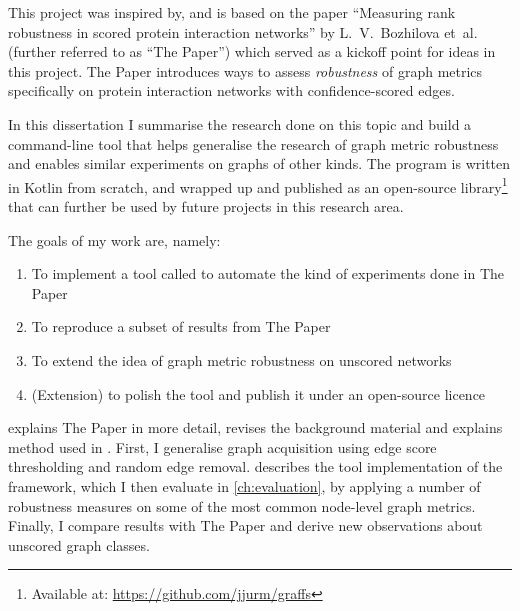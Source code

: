 This project was inspired by, and is based on the paper ``Measuring rank robustness in scored protein interaction networks'' by L.~V.~Bozhilova et~al.~\cite{Bozhilova2019} (further referred to as ``The Paper'') which served as a kickoff point for ideas in this project.
The Paper introduces ways to assess \textsl{robustness} of graph metrics specifically on protein interaction networks with confidence-scored edges.

In this dissertation I summarise the research done on this topic and build a command-line tool \graffs that helps generalise the research of graph metric robustness and enables similar experiments on graphs of other kinds.
The program is written in Kotlin from scratch, and wrapped up and published as an open-source library\footnote{Available at: \url{https://github.com/jjurm/graffs}} that can further be used by future projects in this research area.

The goals of my work are, namely:
\begin{enumerate}[noitemsep,topsep=5pt]
    \item To implement a tool called \graffs to automate the kind of experiments done in The Paper
    \item To reproduce a subset of results from The Paper
    \item To extend the idea of graph metric robustness on unscored networks
    \item (Extension) to polish the tool and publish it under an open-source licence
\end{enumerate}

 explains The Paper in more detail, revises the background material and explains method used in \graffs.
First, I generalise graph acquisition using edge score thresholding and random edge removal.
 describes the tool implementation of the framework, which I then evaluate in \cref{ch:evaluation}, by applying a number of robustness measures on some of the most common node-level graph metrics.
Finally, I compare results with The Paper and derive new observations about unscored graph classes.

